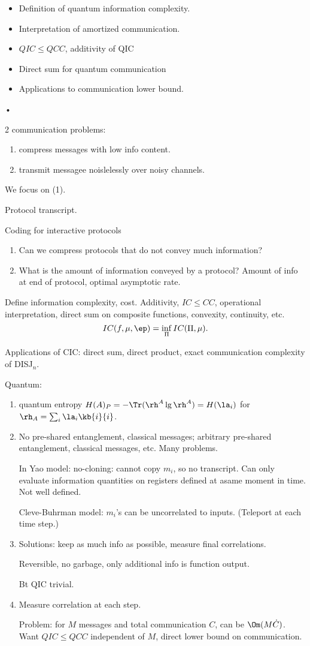 \begin{itemize}
\item
Definition of quantum information complexity. 
\item
Interpretation of amortized communication. 
\item
$QIC\le QCC$, additivity of QIC
\item
Direct sum for quantum communication
\item
Applications to communication lower bound.
\end{itemize}•

2 communication problems:
\begin{enumerate}
\item
compress messages with low info content.
\item
transmit messagee noislelessly over noisy channels.
\end{enumerate}
We focus on (1).


Protocol transcript. %

Coding for interactive protocols
\begin{enumerate}
\item
Can we compress protocols that do not convey much information?
\item
What is the amount of information conveyed by a protocol? Amount of info at end of protocol, optimal asymptotic rate.
\end{enumerate}
Define information complexity, cost. Additivity, $IC\le CC$, operational interpretation, direct sum on composite functions, convexity, continuity, etc.
\[
IC(f,\mu,\ep)=\inf_{\Pi}IC(\Pi,\mu).
\]

Applications of CIC: direct sum, direct product, exact communication complexity of DISJ${}_n$.

Quantum:
\begin{enumerate}
\item
quantum entropy $H(A)_P=-\Tr(\rh^A\lg \rh^A)=H(\la_i)$ for $\rh_A=\sum_i\la_i\kb{i}{i}$. 
\item
No pre-shared entanglement, classical messages; arbitrary pre-shared entanglement, classical messages, etc. Many problems.

In Yao model: no-cloning: cannot copy $m_i$, so no transcript. Can only evaluate information quantities on registers defined at asame moment in time. Not well defined.

Cleve-Buhrman model: $m_i$'s can be uncorrelated to inputs. (Teleport at each time step.)
\item Solutions: keep as much info as possible, measure final correlations.

Reversible, no garbage, only additional info is function output.

Bt QIC trivial.
\item
Measure correlation at each step.

Problem: for $M$ messages and total communication $C$, can be $\Om(M\dot C)$. Want $QIC\le QCC$ independent of $M$, direct lower bound on communication.
\end{enumerate}

